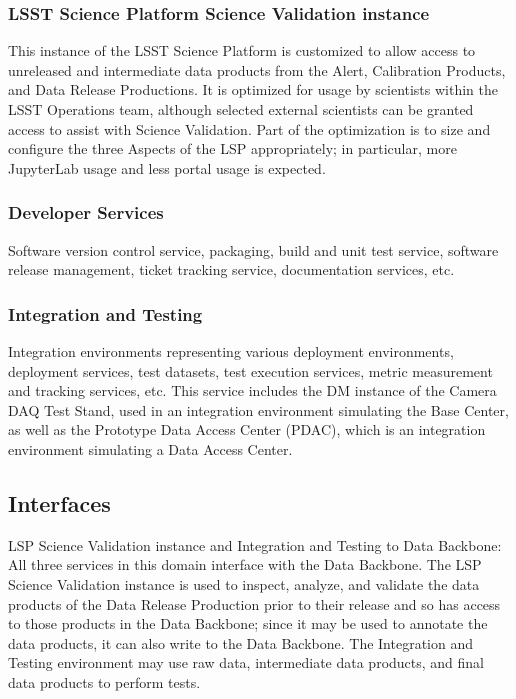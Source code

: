 \documentclass[DM,toc]{lsstdoc}
\begin{document}
\subsubsection{LSST Science Platform Science Validation
instance}\label{lsst-science-platform-science-validation-instance}

This instance of the LSST Science Platform is customized to allow access
to unreleased and intermediate data products from the Alert, Calibration
Products, and Data Release Productions. It is optimized for usage by
scientists within the LSST Operations team, although selected external
scientists can be granted access to assist with Science Validation. Part
of the optimization is to size and configure the three Aspects of the
LSP appropriately; in particular, more JupyterLab usage and less portal
usage is expected.

\subsubsection{Developer Services}\label{developer-services}

Software version control service, packaging, build and unit test
service, software release management, ticket tracking service,
documentation services, etc.

\subsubsection{Integration and Testing}\label{integration-and-testing}

Integration environments representing various deployment environments,
deployment services, test datasets, test execution services, metric measurement
and tracking services, etc.  This service includes the DM instance of the
Camera DAQ Test Stand, used in an integration environment simulating the Base Center, as well
as the Prototype Data Access Center (PDAC), which is an integration environment simulating a Data Access Center.

\subsection{Interfaces}\label{ncsa-ads-interfaces}

LSP Science Validation instance and Integration and Testing to Data Backbone:
All three services in this domain interface with the Data Backbone.  The LSP
Science Validation instance is used to inspect, analyze, and validate the data
products of the Data Release Production prior to their release and so has
access to those products in the Data Backbone; since it may be used to annotate
the data products, it can also write to the Data Backbone.  The Integration and
Testing environment may use raw data, intermediate data products, and final
data products to perform tests.
\end{document}
